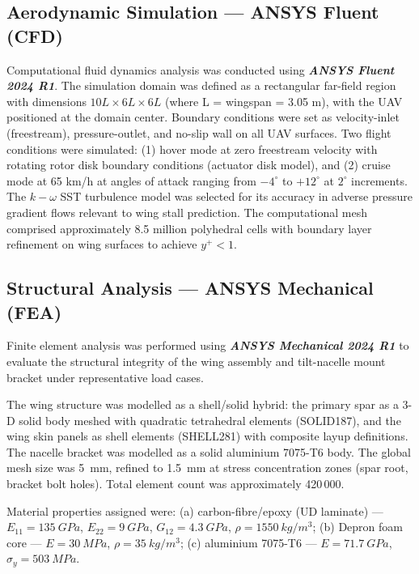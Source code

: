 \documentclass[conference]{IEEEtran}
\begin{document}
\subsection{Aerodynamic Simulation — ANSYS Fluent (CFD)}
Computational fluid dynamics analysis was conducted using \textbf{\textit{ANSYS Fluent 2024 R1}}. The simulation domain was defined as a rectangular far-field region with dimensions $10L \times 6L \times 6L$ (where L = wingspan = 3.05 m), with the UAV positioned at the domain center. Boundary conditions were set as velocity-inlet (freestream), pressure-outlet, and no-slip wall on all UAV surfaces.
Two flight conditions were simulated: (1) hover mode at zero freestream velocity with rotating rotor disk boundary conditions (actuator disk model), and (2) cruise mode at 65 km/h at angles of attack ranging from $-4 ^\circ$ to $+12^\circ$ at $2^\circ$ increments. The $k-\omega$ SST turbulence model was selected for its accuracy in adverse pressure gradient flows relevant to wing stall prediction. The computational mesh comprised approximately 8.5 million polyhedral cells with boundary layer refinement on wing surfaces to achieve $y^+ <1$.

\subsection{Structural Analysis — ANSYS Mechanical (FEA)}
\label{sec:fea_method}

Finite element analysis was performed using \textbf{\textit{ANSYS Mechanical 2024 R1}} to evaluate the structural integrity of the wing assembly and tilt-nacelle mount bracket under representative load cases.

The wing structure was modelled as a shell/solid hybrid: the primary spar as a 3-D solid body meshed with quadratic tetrahedral elements (SOLID187), and the wing skin panels as shell elements (SHELL281) with composite layup definitions. The nacelle bracket was modelled as a solid aluminium 7075-T6 body. The global mesh size was \SI{5}{mm}, refined to \SI{1.5}{mm} at stress concentration zones (spar root, bracket bolt holes). Total element count was approximately 420\,000.

Material properties assigned were: (a) carbon-fibre/epoxy (UD laminate) — $E_{11} = \SI{135}{GPa}$, $E_{22} = \SI{9}{GPa}$, $G_{12} = \SI{4.3}{GPa}$, $\rho = \SI{1550}{kg/m^3}$; (b) Depron foam core — $E = \SI{30}{MPa}$, $\rho = \SI{35}{kg/m^3}$; (c) aluminium 7075-T6 — $E = \SI{71.7}{GPa}$, $\sigma_y = \SI{503}{MPa}$.
\end{document}
